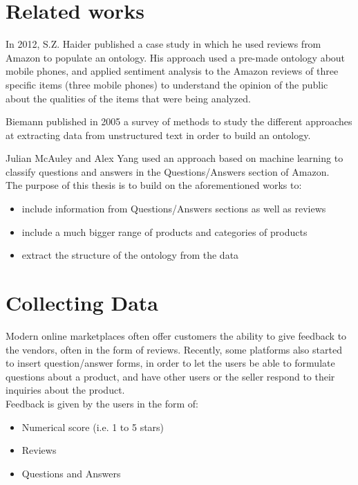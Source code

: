 \documentclass[LaM,binding=0.6cm]{sapthesis}
\begin{document}
\chapter{Related works}

In 2012, S.Z. Haider \cite{haider_ontology_2012} published a case study in which he used reviews from Amazon to populate an ontology. His approach used a pre-made ontology about mobile phones, and applied sentiment analysis to the Amazon reviews of three specific items (three mobile phones) to understand the opinion of the public about the qualities of the items that were being analyzed.

Biemann \cite{biemann_ontology_2005} published in 2005 a survey of methods to study the different approaches at extracting data from unstructured text in order to build an ontology. 

Julian McAuley and Alex Yang \cite{mcauley_addressing_2016} used an approach based on machine learning to classify questions and answers in the Questions/Answers section of Amazon.
\\

The purpose of this thesis is to build on the aforementioned works to:
\begin{itemize}
	\item include information from Questions/Answers sections as well as reviews
	\item include a much bigger range of products and categories of products
	\item  extract the structure of the ontology from the data
\end{itemize}

\chapter{Collecting Data}

Modern online marketplaces often offer customers the ability to give feedback to the vendors, often in the form of reviews. Recently, some platforms also started to insert question/answer forms, in order to let the users be able to formulate questions about a product, and have other users or the seller respond to their inquiries about the product. \\

Feedback is given by the users in the form of:
\begin{itemize}
	\item Numerical score (i.e. 1 to 5 stars)
	\item Reviews
	\item Questions and Answers
\end{itemize}
\end{document}
